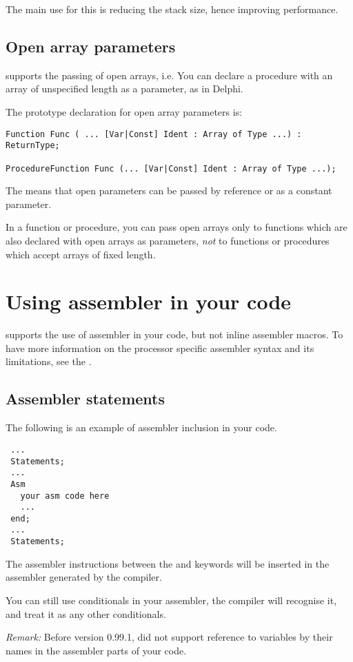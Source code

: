 \documentclass{report}
\begin{document}
The main use for this is reducing the stack size, hence improving
performance.

\subsection{Open array parameters}
\fpc supports the passing of open arrays, i.e. You can declare a procedure
with an array of unspecified length as a parameter, as in Delphi.

The prototype declaration for open array parameters is:
\begin{verbatim}
Function Func ( ... [Var|Const] Ident : Array of Type ...) : ReturnType;

ProcedureFunction Func (... [Var|Const] Ident : Array of Type ...);
\end{verbatim}
The  means that open parameters can be passed by reference
or as a constant parameter.

In a function or procedure, you can pass open arrays only to functions which
are also declared with open arrays as parameters, {\em not} to functions or
procedures which accept arrays of fixed length.

\section{Using assembler in your code}

\fpc supports the use of assembler in your code, but not inline
assembler macros.  To have more information on the processor
specific assembler syntax and its limitations, see the \progref.

\subsection{ Assembler statements }

The following is an example of assembler inclusion in your code.
\begin{verbatim}
 ...
 Statements;
 ...
 Asm
   your asm code here
   ...
 end;
 ...
 Statements;
\end{verbatim}

The assembler instructions between the  and  keywords will
be inserted in the assembler generated by the compiler.

You can still use conditionals in your assembler, the compiler will
recognise it, and treat it as any other conditionals.

\emph{ Remark: } Before version 0.99.1, \fpc did not support
reference to variables by their names in the assembler parts of your code.
\end{document}

